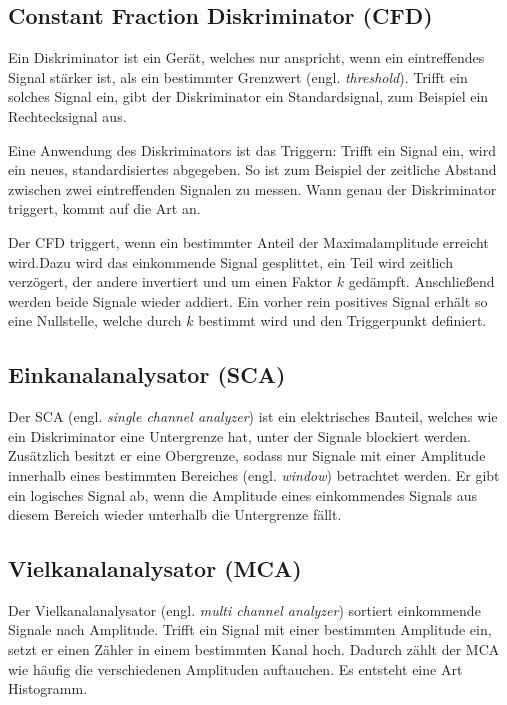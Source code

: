 \subsection{Constant Fraction Diskriminator (CFD)}

Ein Diskriminator ist ein Gerät, welches nur anspricht, wenn ein eintreffendes
Signal stärker ist, als ein bestimmter Grenzwert (engl. \emph{threshold}).
Trifft ein solches Signal ein, gibt der Diskriminator ein Standardsignal, zum
Beispiel ein Rechtecksignal aus.

Eine Anwendung des Diskriminators ist das Triggern: Trifft ein Signal ein, wird
ein neues, standardisiertes abgegeben. So ist zum Beispiel der zeitliche
Abstand zwischen zwei eintreffenden Signalen zu messen. Wann genau der
Diskriminator triggert, kommt auf die Art an.

Der CFD triggert, wenn ein bestimmter Anteil der Maximalamplitude erreicht
wird.Dazu wird das einkommende Signal gesplittet, ein Teil wird zeitlich
verzögert, der andere invertiert und um einen Faktor $k$ gedämpft. Anschließend
werden beide Signale wieder addiert. Ein vorher rein positives Signal erhält so
eine Nullstelle, welche durch $k$ bestimmt wird und den Triggerpunkt definiert.

\subsection{Einkanalanalysator (SCA)}

Der SCA (engl. \emph{single channel analyzer}) ist ein elektrisches Bauteil,
welches wie ein Diskriminator eine Untergrenze hat, unter der Signale blockiert
werden. Zusätzlich besitzt er eine Obergrenze, sodass nur Signale mit einer
Amplitude innerhalb eines bestimmten Bereiches (engl. \emph{window}) betrachtet
werden. Er gibt ein logisches Signal ab, wenn die Amplitude eines einkommendes
Signals aus diesem Bereich wieder unterhalb die Untergrenze fällt.

\subsection{Vielkanalanalysator (MCA)}

Der Vielkanalanalysator (engl. \emph{multi channel analyzer}) sortiert
einkommende Signale nach Amplitude. Trifft ein Signal mit einer bestimmten
Amplitude ein, setzt er einen Zähler in einem bestimmten Kanal hoch. Dadurch
zählt der MCA wie häufig die verschiedenen Amplituden auftauchen. Es entsteht
eine Art Histogramm.

